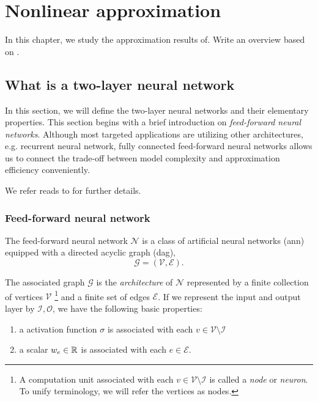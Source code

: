 \chapter{Nonlinear approximation}
\label{ch:preliminary}

In this chapter, we study the approximation results of. 
Write an overview based on \cite{devore_1998,pinkusApproximationTheoryMLP1999}.


\section{What is a two-layer neural network}
\label{sec:what_is_2nn}

In this section, we will define the two-layer neural networks and their
elementary properties. This section begins with a brief introduction on
\textit{feed-forward neural networks}. Although most targeted applications are
utilizing other architectures, e.g. recurrent neural network, fully connected
feed-forward neural networks allows us to connect the trade-off between model
complexity and approximation efficiency conveniently.

We refer reads to \cite{devoreNeuralNetworkApproximation2021,
shalev-shwartzUnderstandingMachineLearning2014} for further details.

\subsection{Feed-forward neural network}

The feed-forward neural network $\mathcal{N}$ is a class of artificial neural
networks (\gls{ann}) equipped with a directed acyclic graph (\gls{dag}),
\begin{equation*}
    \mathcal{G} = (\mathcal{V}, \mathcal{E}).
\end{equation*}

The associated graph $\mathcal{G}$ is the \textit{architecture} of $\mathcal{N}$
represented by a finite collection of vertices $\mathcal{V}$ 
\footnote{
    A computation unit associated with each $v \in \mathcal{V} \setminus \mathcal{I}$
    is called a \textit{node} or \textit{neuron}. To unify terminology, we will 
    refer the vertices as nodes.
}
and a finite set of edges $\mathcal{E}$. If we represent the input and output
layer by $\mathcal{I, O}$, we have the following basic properties: 
\begin{enumerate}
    \item a activation function $\sigma$ is associated with each $v \in
    \mathcal{V} \setminus \mathcal{I}$
    \item a scalar $w_e \in \mathbb{R}$ is associated with each $e \in \mathcal{E}$.    
\end{enumerate}

